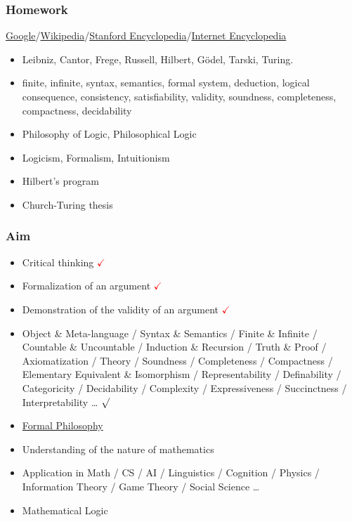 \documentclass[UTF8,11pt,colorlinks,compress,openany]{beamer}%
\begin{document}
\begin{frame}\frametitle{Homework}
		\href{https://www.google.com/}{Google}/\href{https://www.wikipedia.org/}{Wikipedia}/\href{https://plato.stanford.edu/}{Stanford Encyclopedia}/\href{https://www.iep.utm.edu/}{Internet Encyclopedia}
		\begin{itemize}
			\item Leibniz, Cantor, Frege, Russell, Hilbert, G\"odel, Tarski, Turing.
			\item finite, infinite, syntax, semantics, formal system, deduction, logical consequence, consistency, satisfiability, validity, soundness, completeness, compactness, decidability
			\item Philosophy of Logic, Philosophical Logic
			\item Logicism, Formalism, Intuitionism
			\item Hilbert's program
			\item Church-Turing thesis
		\end{itemize}
\end{frame}

\begin{frame}\frametitle{Aim}
	\begin{itemize}
		\item Critical thinking \textcolor{red}{$\checkmark$}
		\item Formalization of an argument \textcolor{red}{$\checkmark$}
		\item Demonstration of the validity of an argument \textcolor{red}{$\checkmark$}
		\item {\small Object \& Meta-language / Syntax \& Semantics / Finite \& Infinite / Countable \& Uncountable / Induction \& Recursion / Truth \& Proof / Axiomatization / Theory / Soundness / Completeness / Compactness / Elementary Equivalent \& Isomorphism / Representability / Definability / Categoricity / Decidability / Complexity / Expressiveness / Succinctness / Interpretability \dots} \textcolor{green}{$\surd$}
		\item \href{https://plato.stanford.edu/entries/formal-epistemology/}{Formal Philosophy}
		\item Understanding of the nature of mathematics
		\item Application in Math / CS / AI / Linguistics / Cognition / Physics / Information Theory / Game Theory / Social Science \dots
		\item Mathematical Logic
	\end{itemize}
\end{frame}
\end{document}
